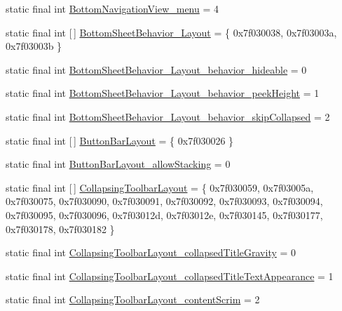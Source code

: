 \begin{DoxyCompactItemize}
\item 
static final int \mbox{\hyperlink{classandroid_1_1support_1_1design_1_1R_1_1styleable_a416c3947a2a572a1fc9977dd8b0da73a}{Bottom\+Navigation\+View\+\_\+menu}} = 4
\item 
static final int \mbox{[}$\,$\mbox{]} \mbox{\hyperlink{classandroid_1_1support_1_1design_1_1R_1_1styleable_a7f0e23bcec0de42839219ed2cfbcb1fe}{Bottom\+Sheet\+Behavior\+\_\+\+Layout}} = \{ 0x7f030038, 0x7f03003a, 0x7f03003b \}
\item 
static final int \mbox{\hyperlink{classandroid_1_1support_1_1design_1_1R_1_1styleable_ab59518af90b1ab471b72c231617e5365}{Bottom\+Sheet\+Behavior\+\_\+\+Layout\+\_\+behavior\+\_\+hideable}} = 0
\item 
static final int \mbox{\hyperlink{classandroid_1_1support_1_1design_1_1R_1_1styleable_adb170df08b76e54f33ccc436cfca032d}{Bottom\+Sheet\+Behavior\+\_\+\+Layout\+\_\+behavior\+\_\+peek\+Height}} = 1
\item 
static final int \mbox{\hyperlink{classandroid_1_1support_1_1design_1_1R_1_1styleable_af755616a860deb9a129d5bb25d4219d6}{Bottom\+Sheet\+Behavior\+\_\+\+Layout\+\_\+behavior\+\_\+skip\+Collapsed}} = 2
\item 
static final int \mbox{[}$\,$\mbox{]} \mbox{\hyperlink{classandroid_1_1support_1_1design_1_1R_1_1styleable_a4f0d1f5f070f55c0bbcd76e065dda963}{Button\+Bar\+Layout}} = \{ 0x7f030026 \}
\item 
static final int \mbox{\hyperlink{classandroid_1_1support_1_1design_1_1R_1_1styleable_a27a9a94f99002736c9c1a6f034b26da6}{Button\+Bar\+Layout\+\_\+allow\+Stacking}} = 0
\item 
static final int \mbox{[}$\,$\mbox{]} \mbox{\hyperlink{classandroid_1_1support_1_1design_1_1R_1_1styleable_a4a019838b1c3daad84b4ffff397db335}{Collapsing\+Toolbar\+Layout}} = \{ 0x7f030059, 0x7f03005a, 0x7f030075, 0x7f030090, 0x7f030091, 0x7f030092, 0x7f030093, 0x7f030094, 0x7f030095, 0x7f030096, 0x7f03012d, 0x7f03012e, 0x7f030145, 0x7f030177, 0x7f030178, 0x7f030182 \}
\item 
static final int \mbox{\hyperlink{classandroid_1_1support_1_1design_1_1R_1_1styleable_ab85cd00fd4e4297fd0e0de46fa282785}{Collapsing\+Toolbar\+Layout\+\_\+collapsed\+Title\+Gravity}} = 0
\item 
static final int \mbox{\hyperlink{classandroid_1_1support_1_1design_1_1R_1_1styleable_ab001e6f6331a614848c62ab802482392}{Collapsing\+Toolbar\+Layout\+\_\+collapsed\+Title\+Text\+Appearance}} = 1
\item 
static final int \mbox{\hyperlink{classandroid_1_1support_1_1design_1_1R_1_1styleable_ac385082b349bba84c2cbce41cc926062}{Collapsing\+Toolbar\+Layout\+\_\+content\+Scrim}} = 2

\end{DoxyCompactItemize}
